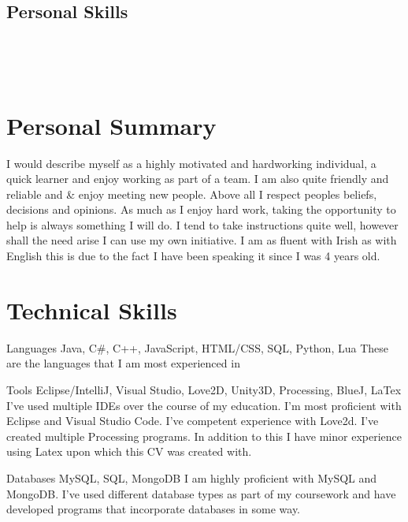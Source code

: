 \documentclass[]{friggeri-cv}
\begin{document}
\begin{aside}
  \section{Personal Skills}
    ~
\end{aside}
~
\section{Personal Summary}
{I would describe myself as a highly motivated and hardworking individual, a quick learner and enjoy working as part of a team. I am also quite friendly and reliable and & enjoy meeting new people. Above all I respect peoples beliefs, decisions and opinions. As much as I enjoy hard work, taking the opportunity to help is always something I will do. I tend to take instructions quite well, however shall the need arise I can use my own initiative. I am as fluent with Irish as with English this is due to the fact I have been speaking it since I was 4 years old.}
\begin{entrylist}

\end{entrylist}

\section{Technical Skills}
\begin{entrylist}

  \entry	
   {Languages} 
   {Java, C\#, C++, JavaScript, HTML/CSS, SQL, Python, Lua}
   {}
   {These are the languages that I am most experienced in}
      
  \entry
  {Tools} 
  {Eclipse/IntelliJ, Visual Studio, Love2D, Unity3D, Processing, BlueJ, LaTex}	
  {}
  {I've used multiple IDEs over the course of my education. I'm most proficient with Eclipse and Visual Studio Code. I've competent experience with Love2d. I've created multiple Processing programs. In addition to this I have minor experience using Latex upon which this CV was created with.\\}
   
  \entry
  {Databases}	
  {MySQL, SQL, MongoDB}
  {}
  {I am highly proficient with MySQL and MongoDB. I've used different database types as part of my coursework and have developed programs that incorporate databases in some way.\\}


\end{entrylist}
\\
\end{document}
